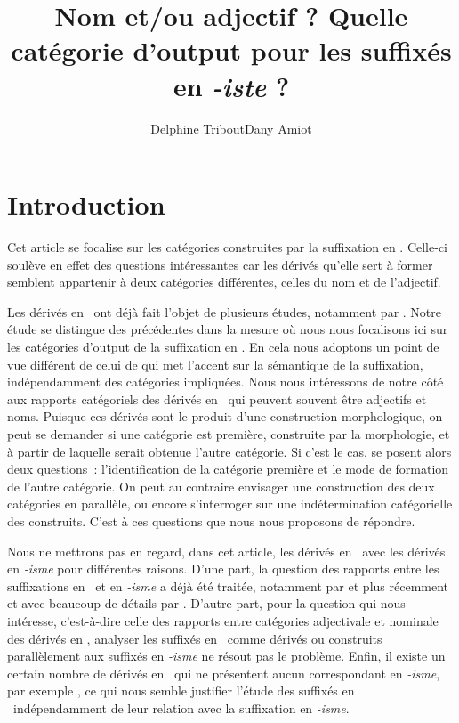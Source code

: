 \documentclass[output=paper]{LSP/langsci}
\author{Delphine Tribout\affiliation{Université de Lille}\lastand Dany Amiot\affiliation{Université de Lille} }
\title{\texorpdfstring{Nom et/ou adjectif ? Quelle catégorie d'output pour les suffixés en \textit{-iste} ?}{Nom et/ou adjectif ? Quelle catégorie d'output pour les suffixés en {-iste} ?}}
\begin{document}

\section{Introduction}
Cet article se focalise sur les catégories construites par la suffixation en \iste. Celle-ci soulève en effet des questions intéressantes car les dérivés qu'elle sert à former semblent appartenir à deux catégories différentes, celles du nom et de l'adjectif.

Les dérivés en \iste\ ont déjà fait l'objet de plusieurs études, notamment par \citep{dubois62, corbin88, roche11}.  Notre étude  se distingue des précédentes dans la mesure où nous nous focalisons ici sur les catégories d'output de la suffixation en \iste. En cela nous adoptons un point de vue différent de celui de \citep{roche11} qui met l'accent sur la sémantique de la suffixation, indépendamment des catégories impliquées. Nous nous intéressons de notre côté aux rapports catégoriels des dérivés en \iste\ qui peuvent souvent être adjectifs et noms. Puisque ces dérivés sont le produit d'une construction morphologique, on peut se demander si une catégorie est  première, construite par la morphologie, et à partir de laquelle serait obtenue l'autre catégorie. Si c'est le cas, se posent alors deux questions~: l'identification de la catégorie première et le mode de formation de l'autre catégorie. On peut au contraire envisager une construction des deux catégories en parallèle, ou encore s'interroger sur une indétermination catégorielle des construits.
C'est à ces questions que nous nous proposons de répondre.

Nous ne mettrons pas en regard, dans cet article, les dérivés en \iste\ avec les dérivés en  \textit{-isme} pour différentes raisons. D'une part, la question des rapports entre les suffixations en \iste\ et en \textit{-isme} a déjà été traitée, notamment par \citep{corbin88} et plus récemment et avec beaucoup de détails par \citep{roche11}. D'autre part, pour la question qui nous intéresse, c'est-à-dire celle des rapports entre catégories adjectivale et nominale des dérivés en \iste, analyser les suffixés en \iste\ comme dérivés ou construits parallèlement aux suffixés en \textit{-isme} ne résout pas le problème. Enfin, il existe un certain nombre de dérivés en \iste\ qui ne présentent aucun correspondant en \textit{-isme}, par exemple , ce qui nous semble justifier l'étude des suffixés en \iste\ indépendamment de leur relation avec la suffixation en \textit{-isme}.
\end{document}
